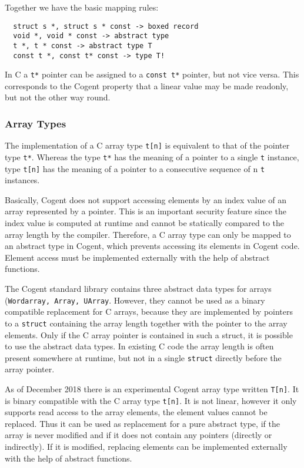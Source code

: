\documentclass[a4paper]{report}
\newcommand{\code}[1]{\textnormal{\texttt{#1}}}
\begin{document}
Together we have the basic mapping rules:
\begin{verbatim}
  struct s *, struct s * const -> boxed record
  void *, void * const -> abstract type
  t *, t * const -> abstract type T
  const t *, const t* const -> type T!
\end{verbatim}

In C a \code{t*} pointer can be assigned to a \code{const t*} pointer, but not vice versa. This corresponds to
the Cogent property that a linear value may be made readonly, but not the other way round.

\subsubsection{Array Types}

The implementation of a C array type \code{t[n]} is equivalent to that of the pointer type \code{t*}. 
Whereas the type \code{t*} has the meaning of a pointer to a single \code{t} instance, type \code{t[n]}
has the meaning of a pointer to a consecutive sequence of n \code{t} instances. 

Basically, Cogent does not support accessing elements by an index value of an array represented by a pointer. 
This is an important security feature since the index value is computed at runtime and cannot be statically 
compared to the array length by the compiler. Therefore, a C array type can only be mapped to an abstract type 
in Cogent, which prevents accessing its elements in Cogent code. Element access must be implemented externally 
with the help of abstract functions.

The Cogent standard library contains three abstract data types for arrays (\code{Wordarray, Array, UArray}. 
However, they cannot be used as a binary compatible replacement for C arrays, because they are implemented by 
pointers to a \code{struct} containing the array length together with the pointer to the array elements. 
Only if the C array pointer is contained in such a struct, it is possible to use the abstract data types. 
In existing C code the array length is often present somewhere at runtime, but not in a single \code{struct}
directly before the array pointer.

As of December 2018 there is an experimental Cogent array type written \code{T[n]}. It is binary compatible 
with the C array type \code{t[n]}. It is not linear, however it only supports read access to the array elements, 
the element values cannot be replaced. Thus it can be used as replacement for a pure abstract type, if the array 
is never modified and if it does not contain any pointers (directly or indirectly). If it is modified, replacing
elements can be implemented externally with the help of abstract functions.
\end{document}
